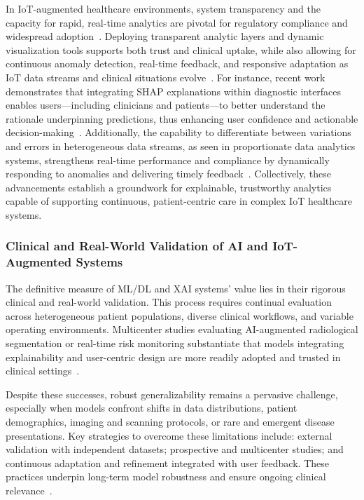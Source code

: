 \documentclass[sigconf]{acmart}
\begin{document}
In IoT-augmented healthcare environments, system transparency and the capacity for rapid, real-time analytics are pivotal for regulatory compliance and widespread adoption~\cite{ref90,ref106}. Deploying transparent analytic layers and dynamic visualization tools supports both trust and clinical uptake, while also allowing for continuous anomaly detection, real-time feedback, and responsive adaptation as IoT data streams and clinical situations evolve~\cite{ref87,ref99}. For instance, recent work demonstrates that integrating SHAP explanations within diagnostic interfaces enables users—including clinicians and patients—to better understand the rationale underpinning predictions, thus enhancing user confidence and actionable decision-making~\cite{ref87,ref99}. Additionally, the capability to differentiate between variations and errors in heterogeneous data streams, as seen in proportionate data analytics systems, strengthens real-time performance and compliance by dynamically responding to anomalies and delivering timely feedback~\cite{ref106}. Collectively, these advancements establish a groundwork for explainable, trustworthy analytics capable of supporting continuous, patient-centric care in complex IoT healthcare systems.

\subsubsection{Clinical and Real-World Validation of AI and IoT-Augmented Systems}

The definitive measure of ML/DL and XAI systems’ value lies in their rigorous clinical and real-world validation. This process requires continual evaluation across heterogeneous patient populations, diverse clinical workflows, and variable operating environments. Multicenter studies evaluating AI-augmented radiological segmentation or real-time risk monitoring substantiate that models integrating explainability and user-centric design are more readily adopted and trusted in clinical settings~\cite{ref77,ref80,ref84,ref98,ref99,ref107}.

Despite these successes, robust generalizability remains a pervasive challenge, especially when models confront shifts in data distributions, patient demographics, imaging and scanning protocols, or rare and emergent disease presentations. Key strategies to overcome these limitations include: external validation with independent datasets; prospective and multicenter studies; and continuous adaptation and refinement integrated with user feedback. These practices underpin long-term model robustness and ensure ongoing clinical relevance~\cite{ref77,ref99,ref107}.
\end{document}
